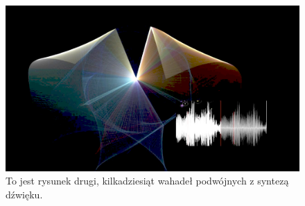 \documentclass[a4paper,12pt,reqno]{article}
\begin{document}
\begin{figure}[!ht]%
\centering
\includegraphics[width=0.8\columnwidth]{pendulums.png}
\caption{To jest rysunek drugi, kilkadziesiąt wahadeł podwójnych z syntezą dźwięku.\label{wahadla}}%
%
\qquad
\end{figure} 
\end{document}
